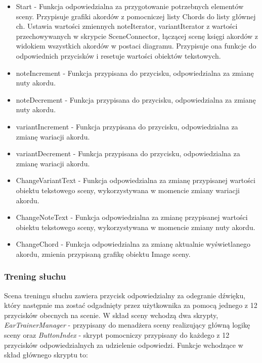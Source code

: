\begin{itemize}
    \item Start - Funkcja odpowiedzialna za przygotowanie potrzebnych elementów sceny. Przypisuje grafiki akordów z pomocniczej listy Chords do listy głównej ch. Ustawia wartości zmiennych noteIterator, variantIterator z wartości przechowywanych w skrypcie SceneConnector, łączącej scenę księgi akordów z widokiem wszystkich akordów w postaci diagramu. Przypisuje ona funkcje do odpowiednich przycisków i resetuje wartości obiektów tekstowych.
    \item noteIncrement - Funkcja przypisana do przycisku, odpowiedzialna za zmianę nuty akordu.
    \item noteDecrement - Funkcja przypisana do przycisku, odpowiedzialna za zmianę nuty akordu.
    \item variantIncrement - Funkcja przypisana do przycisku, odpowiedzialna za zmianę wariacji akordu.
    \item variantDecrement - Funkcja przypisana do przycisku, odpowiedzialna za zmianę wariacji akordu.
    \item ChangeVariantText - Funkcja odpowiedzialna za zmianę przypisanej wartości obiektu tekstowego sceny, wykorzystywana w momencie zmiany wariacji akordu.
    \item ChangeNoteText - Funkcja odpowiedzialna za zmianę przypisanej wartości obiektu tekstowego sceny, wykorzystywana w momencie zmiany nuty akordu.
    \item ChangeChord - Funkcja odpowiedzialna za zmianę aktualnie wyświetlanego akordu, zmienia przypisaną grafikę obiektu Image sceny.
\end{itemize}

\subsubsection{Trening słuchu}

Scena treningu słuchu zawiera przycisk odpowiedzialny za odegranie dźwięku, który następnie ma zostać odgadnięty przez użytkownika za pomocą jednego z 12 przycisków obecnych na scenie. W skład sceny wchodzą dwa skrypty, \emph{EarTrainerManager} - przypisany do menadżera sceny realizujący główną logikę sceny oraz \emph{ButtonIndex} - skrypt pomocniczy przypisany do każdego z 12 przycisków odpowiedzialnych za udzielenie odpowiedzi. Funkcje wchodzące w skład głównego skryptu to:

